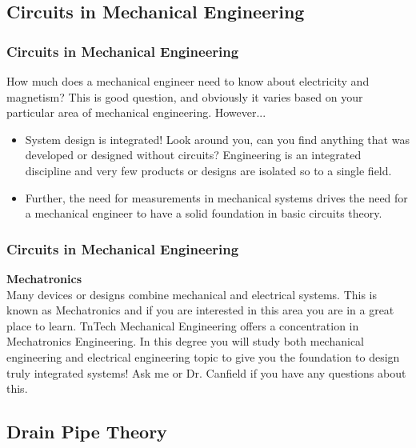 \documentclass[fleqn]{beamer} %
\newcommand{\sectionIIIsubsectionItitle}{Circuits in Mechanical Engineering}
\newcommand{\sectionIIIsubsectionIItitle}{Drain Pipe Theory}
\begin{document}
		\subsection{\sectionIIIsubsectionItitle}\label{sectionIIIsubsectionI}

			\begin{frame}
				\frametitle{\sectionIIIsubsectionItitle}

				How much does a mechanical engineer need to know about electricity and magnetism? This is good question, and obviously it varies based on your particular area of mechanical engineering. However...
	
				\begin{itemize}
					
					\item System design is integrated! Look around you, can you find anything that was developed or designed without circuits? Engineering is an integrated discipline and very few products or designs are isolated so to a single field.
					
					\item Further, the need for measurements in mechanical systems drives the need for a mechanical engineer to have a solid foundation in basic circuits theory.
						
				\end{itemize}

				
			\end{frame}

			\begin{frame}
				\frametitle{\sectionIIIsubsectionItitle}
				
				{\bf Mechatronics} \\
				Many devices or designs combine mechanical and electrical systems. This is known as Mechatronics and if you are interested in this area you are in a great place to learn. TnTech Mechanical Engineering offers a concentration in Mechatronics Engineering. In this degree you will study both mechanical engineering and electrical engineering topic to give you the foundation to design truly integrated systems! Ask me or Dr. Canfield if you have any questions about this. 

			\end{frame}

		\subsection{\sectionIIIsubsectionIItitle}\label{sectionIIIsubsectionII}	
\end{document}
